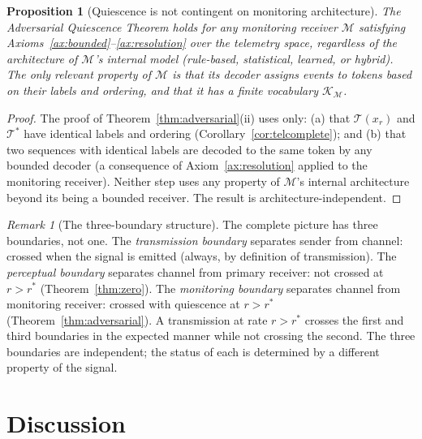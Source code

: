 \documentclass[twocolumn,11pt,a4paper]{article}
\theoremstyle{main}
\newtheorem{proposition}[theorem]{Proposition}
\theoremstyle{definition}
\theoremstyle{remark}
\newtheorem{remark}[theorem]{Remark}
\newcommand{\Know}{\mathcal{K}}
\newcommand{\rate}{r}
\newcommand{\Mon}{\mathcal{M}}        %
\newcommand{\Tel}{\mathcal{T}}        %
\begin{document}
\begin{proposition}[Quiescence is not contingent on monitoring
architecture]
\label{prop:architecture}
The Adversarial Quiescence Theorem holds for any monitoring receiver
$\Mon$ satisfying Axioms~\ref{ax:bounded}--\ref{ax:resolution} over
the telemetry space, regardless of the architecture of $\Mon$'s
internal model (rule-based, statistical, learned, or hybrid). The
only relevant property of $\Mon$ is that its decoder assigns events
to tokens based on their labels and ordering, and that it has a
finite vocabulary $\Know_\Mon$.
\end{proposition}

\begin{proof}
The proof of Theorem~\ref{thm:adversarial}(ii) uses only:
(a) that $\Tel(x_\rate)$ and $\Tel^*$ have identical labels and
ordering (Corollary~\ref{cor:telcomplete}); and (b) that two sequences
with identical labels are decoded to the same token by any bounded
decoder (a consequence of Axiom~\ref{ax:resolution} applied to the
monitoring receiver). Neither step uses any property of $\Mon$'s
internal architecture beyond its being a bounded receiver. The result
is architecture-independent.
\end{proof}

\begin{remark}[The three-boundary structure]
The complete picture has three boundaries, not one. The
\emph{transmission boundary} separates sender from channel: crossed
when the signal is emitted (always, by definition of transmission).
The \emph{perceptual boundary} separates channel from primary
receiver: not crossed at $\rate > \rate^*$ (Theorem~\ref{thm:zero}).
The \emph{monitoring boundary} separates channel from monitoring
receiver: crossed with quiescence at $\rate > \rate^*$
(Theorem~\ref{thm:adversarial}). A transmission at rate $\rate >
\rate^*$ crosses the first and third boundaries in the expected manner
while not crossing the second. The three boundaries are independent;
the status of each is determined by a different property of the signal.
\end{remark}

\section{Discussion}
\label{sec:discussion}
\end{document}
